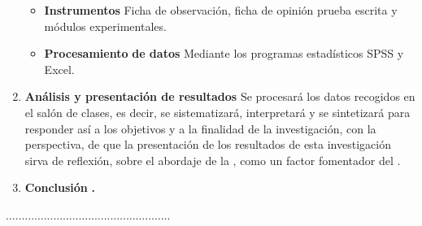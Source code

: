 \documentclass[12pt,a4paper]{article}
\begin{document}
\begin{enumerate}
\begin{itemize}
		      \item \textbf{Instrumentos} Ficha de observación, ficha de opinión prueba
		            escrita y módulos experimentales.
		      \item \textbf{Procesamiento} \textbf{de datos} Mediante los programas estadísticos SPSS y Excel.
	      \end{itemize}
	\item \textbf{Análisis y presentación de resultados} Se procesará los datos
	      recogidos en el salón de clases, es decir, se sistematizará, interpretará
	      y se sintetizará para responder así a los objetivos y a la finalidad
	      de la investigación, con la perspectiva, de que la presentación de
	      los resultados de esta investigación sirva de reflexión, sobre el
	      abordaje de la \MakeTextLowercase{\variablei}, como un factor
	      fomentador del \MakeTextLowercase{\variabled}.
	\item \textbf{Conclusión }\hipotesis\textbf{.}
\end{enumerate}
\textbf{\vspace{0.5cm}
}
\begin{center}
	....................................................\\
	\autor
\end{center}

\clearpage
\end{document}
